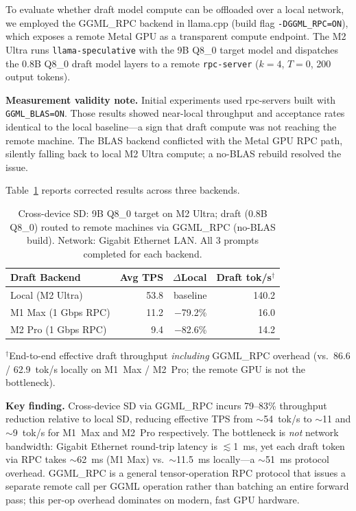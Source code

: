 \documentclass[11pt,a4paper]{article}
\begin{document}
To evaluate whether draft model compute can be offloaded over a local network,
we employed the GGML\_RPC backend in llama.cpp
(build flag \texttt{-DGGML\_RPC=ON}), which exposes a remote Metal GPU as a
transparent compute endpoint.
The M2 Ultra runs \texttt{llama-speculative} with the 9B Q8\_0 target model
and dispatches the 0.8B Q8\_0 draft model layers to a remote
\texttt{rpc-server} ($k=4$, $T=0$, 200 output tokens).

\begin{sloppypar}
\textbf{Measurement validity note.}
Initial experiments used rpc-servers built with \texttt{GGML\_BLAS=ON}.
Those results showed near-local throughput and acceptance rates identical to
the local baseline---a sign that draft compute was not reaching the remote machine.
The BLAS backend conflicted with the Metal GPU RPC path, silently falling back
to local M2 Ultra compute; a no-BLAS rebuild resolved the issue.
\end{sloppypar}

Table~\ref{tab:cross_device_sd} reports corrected results across three backends.

\begin{table}[h]
\centering
\caption{Cross-device SD: 9B Q8\_0 target on M2 Ultra; draft (0.8B Q8\_0)
routed to remote machines via GGML\_RPC (no-BLAS build). Network: Gigabit
Ethernet LAN. All 3 prompts completed for each backend.}
\label{tab:cross_device_sd}
\begin{tabular}{lrrr}
\toprule
\textbf{Draft Backend} & \textbf{Avg TPS} & \textbf{$\Delta$Local} & \textbf{Draft tok/s$^\dagger$} \\
\midrule
Local (M2 Ultra)     & 53.8 & baseline  & 140.2 \\
M1 Max (1 Gbps RPC)  & 11.2 & $-$79.2\% & 16.0  \\
M2 Pro (1 Gbps RPC)  &  9.4 & $-$82.6\% & 14.2  \\
\bottomrule
\end{tabular}
\end{table}
\vspace{-0.5em}
{\small $^\dagger$End-to-end effective draft throughput \emph{including}
GGML\_RPC overhead (vs.\ 86.6 / 62.9~tok/s locally on M1~Max / M2~Pro;
the remote GPU is not the bottleneck).}
\vspace{0.5em}

\textbf{Key finding.}
Cross-device SD via GGML\_RPC incurs 79--83\% throughput reduction relative to
local SD, reducing effective TPS from $\sim$54~tok/s to $\sim$11 and
$\sim$9~tok/s for M1~Max and M2~Pro respectively.
The bottleneck is \emph{not} network bandwidth: Gigabit Ethernet round-trip
latency is $\lesssim$1~ms, yet each draft token via RPC takes $\sim$62~ms
(M1 Max) vs.\ $\sim$11.5~ms locally---a $\sim$51~ms protocol overhead.
GGML\_RPC is a general tensor-operation RPC protocol that issues a separate
remote call per GGML operation rather than batching an entire forward pass;
this per-op overhead dominates on modern, fast GPU hardware.
\end{document}
